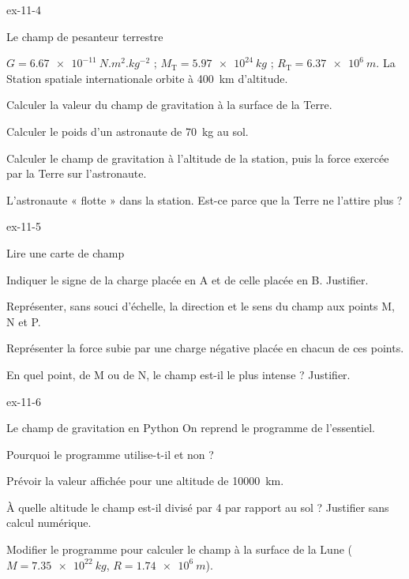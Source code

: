 \begin{blocLivre}{ex-11-4}
\begin{exercice}[1]{Le champ de pesanteur terrestre}
\begin{donnees}
$G=\qty{6,67e-11}{N.m^2.kg^{-2}}$ ; $M_\mathrm{T}=\qty{5,97e24}{kg}$ ; $R_\mathrm{T}=\qty{6,37e6}{m}$. La Station spatiale internationale orbite à \qty{400}{km} d'altitude.
\end{donnees}
\begin{questions}
\item Calculer la valeur du champ de gravitation à la surface de la Terre.
\item Calculer le poids d'un astronaute de \qty{70}{kg} au sol.
\item Calculer le champ de gravitation à l'altitude de la station, puis la force exercée par la Terre sur l'astronaute.
\item L'astronaute « flotte » dans la station. Est-ce parce que la Terre ne l'attire plus ?
\end{questions}
\end{exercice}
\end{blocLivre}
\begin{blocLivre}{ex-11-5}
\begin{exercice}[1]{Lire une carte de champ}
\begin{questions}
\item Indiquer le signe de la charge placée en A et de celle placée en B. Justifier.
\item Représenter, sans souci d'échelle, la direction et le sens du champ aux points M, N et P.
\item Représenter la force subie par une charge négative placée en chacun de ces points.
\item En quel point, de M ou de N, le champ est-il le plus intense ? Justifier.
\end{questions}
\end{exercice}
\end{blocLivre}
\begin{blocLivre}{ex-11-6}
\begin{exercice}[2]{Le champ de gravitation en Python}
On reprend le programme de l'essentiel.
\begin{questions}
\item {}Pourquoi le programme utilise-t-il  et non  ?
\item Prévoir la valeur affichée pour une altitude de \qty{10000}{km}.
\item À quelle altitude le champ est-il divisé par 4 par rapport au sol ? Justifier sans calcul numérique.
\item Modifier le programme pour calculer le champ à la surface de la Lune ($M=\qty{7,35e22}{kg}$, $R=\qty{1,74e6}{m}$).
\end{questions}
\end{exercice}
\end{blocLivre}
